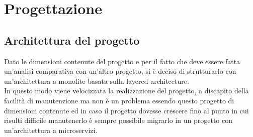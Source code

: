 
\chapter{Progettazione}
\label{cap:progettazione}

\section{Architettura del progetto}
Dato le dimensioni contenute del progetto e per il fatto che deve essere fatta un'analisi 
comparativa con un'altro progetto, si è deciso di strutturarlo con un'architettura a monolite
basata sulla layered architecture.
\\
In questo modo viene velocizzata la realizzazione del progetto, a discapito della facilità di
manutenzione ma non è un problema essendo questo progetto di dimensioni contenute ed in caso
il progetto dovesse crescere fino al punto in cui risulti difficile manutenerlo è sempre possibile
migrarlo in un progetto con un'architettura a microservizi.

